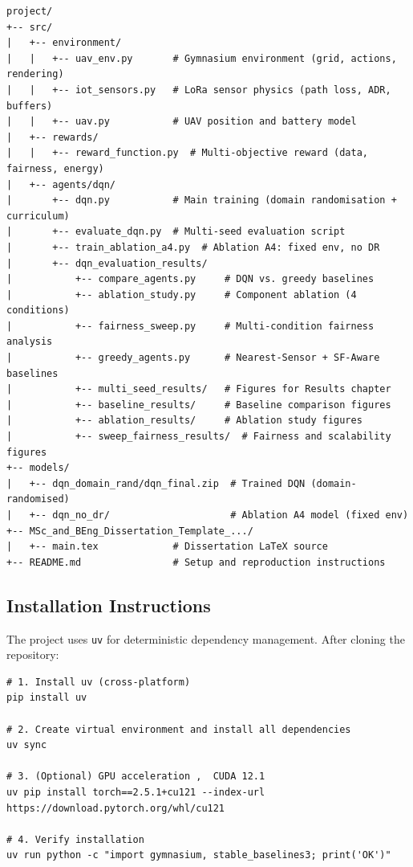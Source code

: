 {\footnotesize
\begin{verbatim}
project/
+-- src/
|   +-- environment/
|   |   +-- uav_env.py       # Gymnasium environment (grid, actions, rendering)
|   |   +-- iot_sensors.py   # LoRa sensor physics (path loss, ADR, buffers)
|   |   +-- uav.py           # UAV position and battery model
|   +-- rewards/
|   |   +-- reward_function.py  # Multi-objective reward (data, fairness, energy)
|   +-- agents/dqn/
|       +-- dqn.py           # Main training (domain randomisation + curriculum)
|       +-- evaluate_dqn.py  # Multi-seed evaluation script
|       +-- train_ablation_a4.py  # Ablation A4: fixed env, no DR
|       +-- dqn_evaluation_results/
|           +-- compare_agents.py     # DQN vs. greedy baselines
|           +-- ablation_study.py     # Component ablation (4 conditions)
|           +-- fairness_sweep.py     # Multi-condition fairness analysis
|           +-- greedy_agents.py      # Nearest-Sensor + SF-Aware baselines
|           +-- multi_seed_results/   # Figures for Results chapter
|           +-- baseline_results/     # Baseline comparison figures
|           +-- ablation_results/     # Ablation study figures
|           +-- sweep_fairness_results/  # Fairness and scalability figures
+-- models/
|   +-- dqn_domain_rand/dqn_final.zip  # Trained DQN (domain-randomised)
|   +-- dqn_no_dr/                     # Ablation A4 model (fixed env)
+-- MSc_and_BEng_Dissertation_Template_.../
|   +-- main.tex             # Dissertation LaTeX source
+-- README.md                # Setup and reproduction instructions
\end{verbatim}
}

\subsection*{Installation Instructions}

The project uses \texttt{uv} for deterministic dependency management. After cloning the repository:

{\footnotesize
\begin{verbatim}
# 1. Install uv (cross-platform)
pip install uv

# 2. Create virtual environment and install all dependencies
uv sync

# 3. (Optional) GPU acceleration ,  CUDA 12.1
uv pip install torch==2.5.1+cu121 --index-url https://download.pytorch.org/whl/cu121

# 4. Verify installation
uv run python -c "import gymnasium, stable_baselines3; print('OK')"
\end{verbatim}
}

